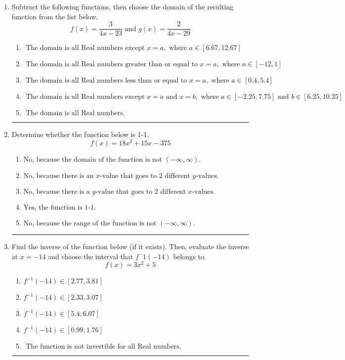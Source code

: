 \documentclass[14pt]{extbook}
\newcommand{\litem}[1]{\item#1\hspace*{-1cm}\rule{\textwidth}{0.4pt}}
\begin{document}
\begin{enumerate}
{\begin{enumerate}[label=\Alph*.]
\end{enumerate} }
\litem{
Subtract the following functions, then choose the domain of the resulting function from the list below.\[ f(x) = \frac{3}{4x-23} \text{ and } g(x) = \frac{2}{4x-29} \]\begin{enumerate}[label=\Alph*.]
\item \( \text{ The domain is all Real numbers except } x = a, \text{ where } a \in [6.67, 12.67] \)
\item \( \text{ The domain is all Real numbers greater than or equal to } x = a, \text{ where } a \in [-12, 1] \)
\item \( \text{ The domain is all Real numbers less than or equal to } x = a, \text{ where } a \in [0.4, 5.4] \)
\item \( \text{ The domain is all Real numbers except } x = a \text{ and } x = b, \text{ where } a \in [-2.25, 7.75] \text{ and } b \in [6.25, 10.25] \)
\item \( \text{ The domain is all Real numbers. } \)

\end{enumerate} }
\litem{
Determine whether the function below is 1-1.\[ f(x) = 18 x^2 + 15 x - 375 \]\begin{enumerate}[label=\Alph*.]
\item \( \text{No, because the domain of the function is not $(-\infty, \infty)$.} \)
\item \( \text{No, because there is an $x$-value that goes to 2 different $y$-values.} \)
\item \( \text{No, because there is a $y$-value that goes to 2 different $x$-values.} \)
\item \( \text{Yes, the function is 1-1.} \)
\item \( \text{No, because the range of the function is not $(-\infty, \infty)$.} \)

\end{enumerate} }
\litem{
Find the inverse of the function below (if it exists). Then, evaluate the inverse at $x = -14$ and choose the interval that $f^-1(-14)$ belongs to.\[ f(x) = 3 x^2 + 5 \]\begin{enumerate}[label=\Alph*.]
\item \( f^{-1}(-14) \in [2.77, 3.81] \)
\item \( f^{-1}(-14) \in [2.33, 3.07] \)
\item \( f^{-1}(-14) \in [5.4, 6.07] \)
\item \( f^{-1}(-14) \in [0.99, 1.76] \)
\item \( \text{ The function is not invertible for all Real numbers. } \)


\end{enumerate}}
\end{enumerate}
\end{document}

